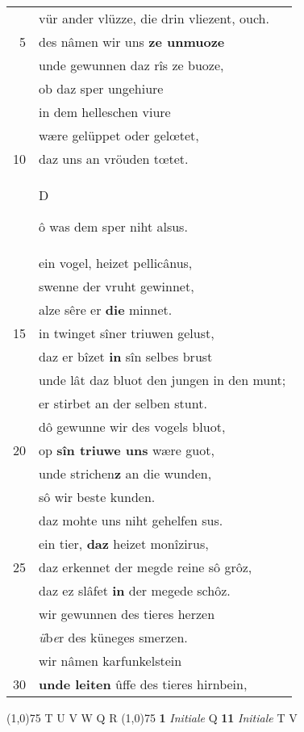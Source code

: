 \documentclass[8pt,a4paper,notitlepage]{article}
\begin{document}
\begin{table}[ht]
\begin{minipage}[t]{0.5\linewidth}
\begin{tabular}{rl}
 & vür ander vlüzze, die drin vliezent, ouch.\\ 
5 & des nâmen wir uns \textbf{ze unmuoze}\\ 
 & unde gewunnen daz rîs ze buoze,\\ 
 & ob daz sper ungehiure\\ 
 & in dem helleschen viure\\ 
 & wære gelüppet oder gelœtet,\\ 
10 & daz uns an vröuden tœtet.\\ 
 & \begin{large}D\end{large}ô was dem sper niht alsus.\\ 
 & ein vogel, heizet pellicânus,\\ 
 & swenne der vruht gewinnet,\\ 
 & alze sêre er \textbf{die} minnet.\\ 
15 & in twinget sîner triuwen gelust,\\ 
 & daz er bîzet \textbf{in} sîn selbes brust\\ 
 & unde lât daz bluot den jungen in den munt;\\ 
 & er stirbet an der selben stunt.\\ 
 & dô gewunne wir des vogels bluot,\\ 
20 & op \textbf{sîn triuwe uns} wære guot,\\ 
 & unde strichen\textbf{z} an die wunden,\\ 
 & sô wir beste kunden.\\ 
 & daz mohte uns niht gehelfen sus.\\ 
 & ein tier, \textbf{daz} heizet monîzirus,\\ 
25 & daz erkennet der megde reine sô grôz,\\ 
 & daz ez slâfet \textbf{in} der megede schôz.\\ 
 & wir gewunnen des tieres herzen\\ 
 & \textit{ü}b\textit{e}r des küneges smerzen.\\ 
 & wir nâmen karfunkelstein\\ 
30 & \textbf{unde leiten} ûffe des tieres hirnbein,\\ 
\end{tabular}
\scriptsize
\line(1,0){75} \newline
T U V W Q R \newline
\line(1,0){75} \newline
\textbf{1} \textit{Initiale} Q  \textbf{11} \textit{Initiale} T V  \newline

\end{minipage}
\end{table}
\end{document}
